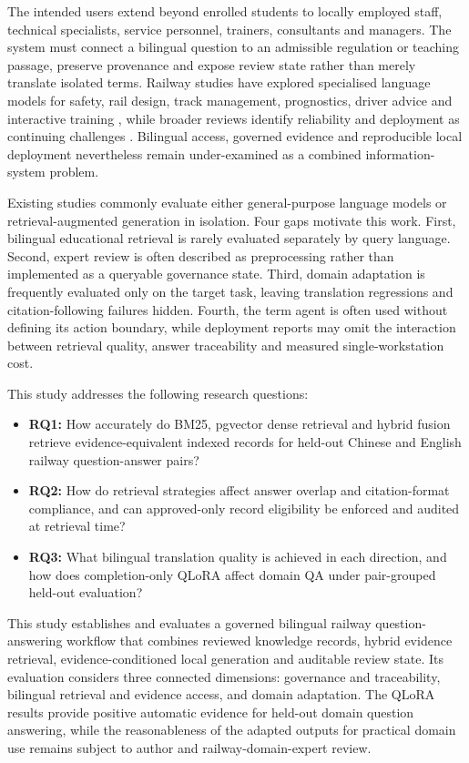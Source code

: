 The intended users extend beyond enrolled students to locally employed staff, technical specialists, service personnel, trainers, consultants and managers. The system must connect a bilingual question to an admissible regulation or teaching passage, preserve provenance and expose review state rather than merely translate isolated terms. Railway studies have explored specialised language models for safety, rail design, track management, prognostics, driver advice and interactive training \citep{zheng2023trafficsafety,lahnalampi2024rail,wang2024phm,song2025railway,luo2025driver,li2025training}, while broader reviews identify reliability and deployment as continuing challenges \citep{wandelt2024transport}. Bilingual access, governed evidence and reproducible local deployment nevertheless remain under-examined as a combined information-system problem.

Existing studies commonly evaluate either general-purpose language models or retrieval-augmented generation in isolation. Four gaps motivate this work. First, bilingual educational retrieval is rarely evaluated separately by query language. Second, expert review is often described as preprocessing rather than implemented as a queryable governance state. Third, domain adaptation is frequently evaluated only on the target task, leaving translation regressions and citation-following failures hidden. Fourth, the term agent is often used without defining its action boundary, while deployment reports may omit the interaction between retrieval quality, answer traceability and measured single-workstation cost.

This study addresses the following research questions:

\begin{itemize}
\item \textbf{RQ1:} How accurately do BM25, pgvector dense retrieval and hybrid fusion retrieve evidence-equivalent indexed records for held-out Chinese and English railway question-answer pairs?
\item \textbf{RQ2:} How do retrieval strategies affect answer overlap and citation-format compliance, and can approved-only record eligibility be enforced and audited at retrieval time?
\item \textbf{RQ3:} What bilingual translation quality is achieved in each direction, and how does completion-only QLoRA affect domain QA under pair-grouped held-out evaluation?
\end{itemize}

This study establishes and evaluates a governed bilingual railway question-answering workflow that combines reviewed knowledge records, hybrid evidence retrieval, evidence-conditioned local generation and auditable review state. Its evaluation considers three connected dimensions: governance and traceability, bilingual retrieval and evidence access, and domain adaptation. The QLoRA results provide positive automatic evidence for held-out domain question answering, while the reasonableness of the adapted outputs for practical domain use remains subject to author and railway-domain-expert review.

